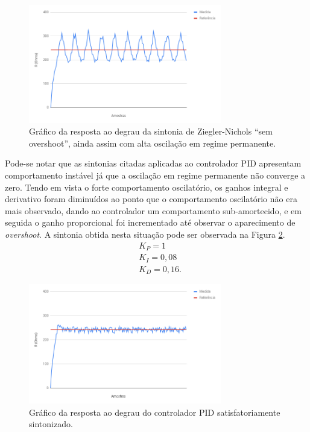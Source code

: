 \begin{figure}[ht]
    \begin{center}
    \includegraphics[width=0.75\textwidth]{figuras/znso.PNG}
    \end{center}
    \caption[Gráfico da sintonia de Ziegler-Nichols ``sem overshoot''.]{Gráfico da resposta ao degrau da sintonia de Ziegler-Nichols ``sem overshoot'', ainda assim com alta oscilação em regime permanente.}
    \label{znso}
\end{figure}

Pode-se notar que as sintonias citadas aplicadas ao controlador PID apresentam comportamento instável já que a oscilação em regime permanente não converge a zero. Tendo em vista o forte comportamento oscilatório, os ganhos integral e derivativo foram diminuídos ao ponto que o comportamento oscilatório não era mais observado, dando ao controlador um comportamento sub-amortecido, e em seguida o ganho proporcional foi incrementado até observar o aparecimento de \textit{overshoot}. A sintonia obtida nesta situação pode ser observada na Figura \ref{znsint}. 
\begin{align}
  &K_P = 1 \nonumber\\
  &K_I = 0,08 \nonumber\\
  &K_D = 0,16. \nonumber
\end{align}

\begin{figure}[ht]
    \begin{center}
    \includegraphics[width=0.75\textwidth]{figuras/znsint.PNG}
    \end{center}
    \caption[Gráfico do controlador PID satisfatoriamente sintonizado.]{Gráfico da resposta ao degrau do controlador PID satisfatoriamente sintonizado.}
    \label{znsint}
\end{figure}

